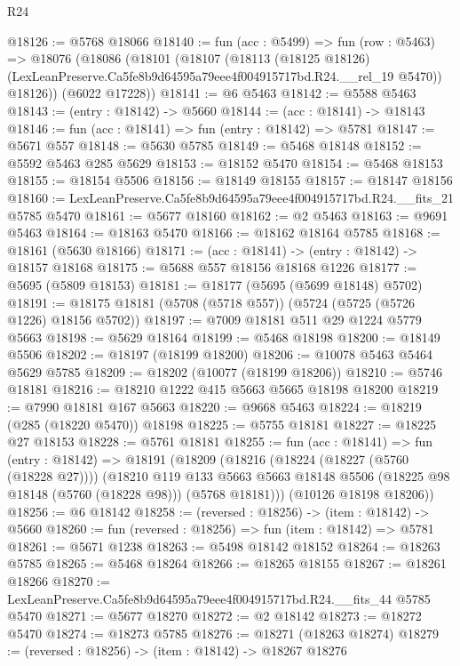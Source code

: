 \begin{lexlean}{R24}
\begin{coremodule}
@18126 := @5768 @18066
@18140 := fun (acc : @5499) =>
  fun (row : @5463) =>
  @18076
    (@18086
      (@18101
        (@18107
          (@18113
            (@18125 @18126)
            (LexLeanPreserve.Ca5fe8b9d64595a79eee4f004915717bd.R24.__rel_19 @5470))
          @18126))
      (@6022 @17228))
@18141 := @6 @5463
@18142 := @5588 @5463
@18143 := (entry : @18142) -> @5660
@18144 := (acc : @18141) -> @18143
@18146 := fun (acc : @18141) => fun (entry : @18142) => @5781
@18147 := @5671 @557
@18148 := @5630 @5785
@18149 := @5468 @18148
@18152 := @5592 @5463 @285 @5629
@18153 := @18152 @5470
@18154 := @5468 @18153
@18155 := @18154 @5506
@18156 := @18149 @18155
@18157 := @18147 @18156
@18160 := LexLeanPreserve.Ca5fe8b9d64595a79eee4f004915717bd.R24.__fits_21 @5785 @5470
@18161 := @5677 @18160
@18162 := @2 @5463
@18163 := @9691 @5463
@18164 := @18163 @5470
@18166 := @18162 @18164 @5785
@18168 := @18161 (@5630 @18166)
@18171 := (acc : @18141) -> (entry : @18142) -> @18157 @18168
@18175 := @5688 @557 @18156 @18168 @1226
@18177 := @5695 (@5809 @18153)
@18181 := @18177 (@5695 (@5699 @18148) @5702)
@18191 := @18175 @18181 (@5708 (@5718 @557)) (@5724 (@5725 (@5726 @1226) @18156 @5702))
@18197 := @7009 @18181 @511 @29 @1224 @5779 @5663
@18198 := @5629 @18164
@18199 := @5468 @18198
@18200 := @18149 @5506
@18202 := @18197 (@18199 @18200)
@18206 := @10078 @5463 @5464 @5629 @5785
@18209 := @18202 (@10077 (@18199 @18206))
@18210 := @5746 @18181
@18216 := @18210 @1222 @415 @5663 @5665 @18198 @18200
@18219 := @7990 @18181 @167 @5663
@18220 := @9668 @5463
@18224 := @18219 (@285 (@18220 @5470)) @18198
@18225 := @5755 @18181
@18227 := @18225 @27 @18153
@18228 := @5761 @18181
@18255 := fun (acc : @18141) =>
  fun (entry : @18142) =>
  @18191
    (@18209
      (@18216
        (@18224 (@18227 (@5760 (@18228 @27))))
        (@18210
          @119
          @133
          @5663
          @5663
          @18148
          @5506
          (@18225 @98 @18148 (@5760 (@18228 @98)))
          (@5768 @18181)))
      (@10126 @18198 @18206))
@18256 := @6 @18142
@18258 := (reversed : @18256) -> (item : @18142) -> @5660
@18260 := fun (reversed : @18256) => fun (item : @18142) => @5781
@18261 := @5671 @1238
@18263 := @5498 @18142 @18152
@18264 := @18263 @5785
@18265 := @5468 @18264
@18266 := @18265 @18155
@18267 := @18261 @18266
@18270 := LexLeanPreserve.Ca5fe8b9d64595a79eee4f004915717bd.R24.__fits_44 @5785 @5470
@18271 := @5677 @18270
@18272 := @2 @18142
@18273 := @18272 @5470
@18274 := @18273 @5785
@18276 := @18271 (@18263 @18274)
@18279 := (reversed : @18256) -> (item : @18142) -> @18267 @18276

\end{coremodule}
\end{lexlean}
